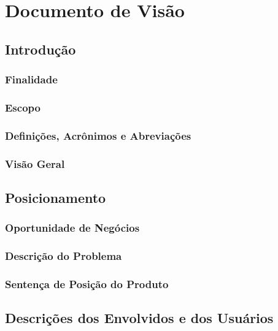 \chapter[Documento de Visão]{Documento de Visão}

\section{Introdução}

\subsection{Finalidade}

\subsection{Escopo}

\subsection{Definições, Acrônimos e Abreviações}

\subsection{Visão Geral}



\section{Posicionamento}


\subsection{Oportunidade de Negócios}

\subsection{Descrição do Problema}

\subsection{Sentença de Posição do Produto}

\section{Descrições dos Envolvidos e dos Usuários}

